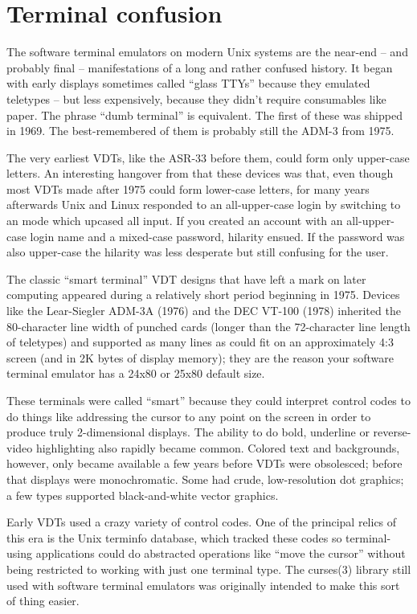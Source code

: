 \documentclass[10pt,twoside,openright]{memoir}
\begin{document}
\section{Terminal confusion}

The software terminal emulators on modern Unix systems are the near-end -- and probably final -- manifestations of a long and rather confused history. It began with early displays sometimes called ``glass TTYs'' because they emulated teletypes -- but less expensively, because they didn't require consumables like paper. The phrase ``dumb terminal'' is equivalent. The first of these was shipped in 1969. The best-remembered of them is probably still the ADM-3 from 1975.

The very earliest VDTs, like the ASR-33 before them, could form only upper-case letters. An interesting hangover from that these devices was that, even though most VDTs made after 1975 could form lower-case letters, for many years afterwards Unix and Linux responded to an all-upper-case login by switching to an mode which upcased all input. If you created an account with an all-upper-case login name and a mixed-case password, hilarity ensued. If the password was also upper-case the hilarity was less desperate but still confusing for the user.

The classic ``smart terminal'' VDT designs that have left a mark on later computing appeared during a relatively short period beginning in 1975. Devices like the Lear-Siegler ADM-3A (1976) and the DEC VT-100 (1978) inherited the 80-character line width of punched cards (longer than the 72-character line length of teletypes) and supported as many lines as could fit on an approximately 4:3 screen (and in 2K bytes of display memory); they are the reason your software terminal emulator has a 24x80 or 25x80 default size.

These terminals were called ``smart'' because they could interpret control codes to do things like addressing the cursor to any point on the screen in order to produce truly 2-dimensional displays. The ability to do bold, underline or reverse-video highlighting also rapidly became common. Colored text and backgrounds, however, only became available a few years before VDTs were obsolesced; before that displays were monochromatic. Some had crude, low-resolution dot graphics; a few types supported black-and-white vector graphics.

Early VDTs used a crazy variety of control codes. One of the principal relics of this era is the Unix terminfo database, which tracked these codes so terminal-using applications could do abstracted operations like ``move the cursor'' without being restricted to working with just one terminal type. The curses(3) library still used with software terminal emulators was originally intended to make this sort of thing easier.
\end{document}
